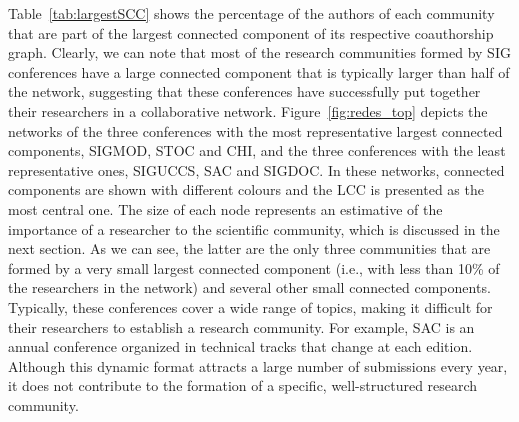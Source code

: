 \documentclass{sig-alternate-10pt}
\begin{document}
Table~\ref{tab:largestSCC} shows the percentage of the authors of each community that are part of the largest connected component of its respective coauthorship graph. Clearly, we can note that most of the research communities formed by SIG conferences have a large connected component that is typically larger than half of the network, suggesting that these conferences have successfully put together their researchers in a collaborative network. Figure~\ref{fig:redes_top} depicts the networks of the three conferences with the most representative largest connected components, SIGMOD, STOC and CHI, and the three conferences with the least representative ones, SIGUCCS, SAC and SIGDOC. In these networks, connected components are shown with different colours and the LCC is presented as the most central one. The size of each node represents an estimative of the importance of a researcher to the scientific community, which is discussed in the next section. As we can see, the latter are the only three communities that are formed by a very small largest connected component (i.e., with less than 10\% of the researchers in the network) and several other small connected components. Typically, these conferences cover a wide range of topics, making it difficult for their researchers to establish a research community. For example, SAC is an annual conference organized in technical tracks that change at each edition. Although this dynamic format attracts a large number of submissions every year, it does not contribute to the formation of a specific, well-structured research community.
\end{document}
